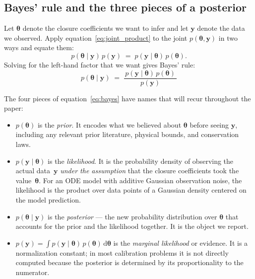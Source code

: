 \documentclass[12pt]{article}
\theoremstyle{plain}
\theoremstyle{definition}
\theoremstyle{remark}
\renewcommand{\d}{\mathrm{d}}
\begin{document}
\subsection{Bayes' rule and the three pieces of a posterior}\label{sec:bg:bayes}

Let $\boldsymbol{\theta}$ denote the closure coefficients we want to infer and
let $\mathbf{y}$ denote the data we observed.  Apply
equation~\eqref{eq:joint_product} to the joint $p(\boldsymbol{\theta}, \mathbf{y})$
in two ways and equate them:
%
\begin{equation}
  p(\boldsymbol{\theta}\mid\mathbf{y})\,p(\mathbf{y})
  \;=\;
  p(\mathbf{y}\mid\boldsymbol{\theta})\,p(\boldsymbol{\theta}).
\end{equation}
%
Solving for the left-hand factor that we want gives Bayes' rule:
%
\begin{equation}
  \boxed{\;
    p(\boldsymbol{\theta}\mid\mathbf{y}) \;=\;
    \frac{\,p(\mathbf{y}\mid\boldsymbol{\theta})\,p(\boldsymbol{\theta})\,}{p(\mathbf{y})}
  \;}
  \label{eq:bayes}
\end{equation}

The four pieces of equation~\eqref{eq:bayes} have names that will recur
throughout the paper:
%
\begin{itemize}
\item $p(\boldsymbol{\theta})$ is the \emph{prior}.  It encodes what we
believed about $\boldsymbol{\theta}$ before seeing $\mathbf{y}$, including any
relevant prior literature, physical bounds, and conservation laws.
\item $p(\mathbf{y}\mid\boldsymbol{\theta})$ is the \emph{likelihood}.  It is
the probability density of observing the actual data~$\mathbf{y}$ \emph{under
the assumption} that the closure coefficients took the value~$\boldsymbol{\theta}$.
For an ODE model with additive Gaussian observation noise, the likelihood is
the product over data points of a Gaussian density centered on the model
prediction.
\item $p(\boldsymbol{\theta}\mid\mathbf{y})$ is the \emph{posterior} —
the new probability distribution over $\boldsymbol{\theta}$ that accounts for
the prior and the likelihood together.  It is the object we report.
\item $p(\mathbf{y}) = \int p(\mathbf{y}\mid\boldsymbol{\theta})
\,p(\boldsymbol{\theta})\,\d\boldsymbol{\theta}$ is the \emph{marginal
likelihood} or evidence.  It is a normalization constant; in most calibration
problems it is not directly computed because the posterior is determined by
its proportionality to the numerator.
\end{itemize}
\end{document}
